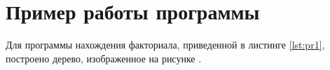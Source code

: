 \section{Пример работы программы}
Для программы нахождения факториала, приведенной в листинге \ref{lst:pr1}, построено дерево, изображенное на рисунке .

\begin{figure}[H]
\end{figure}
 
